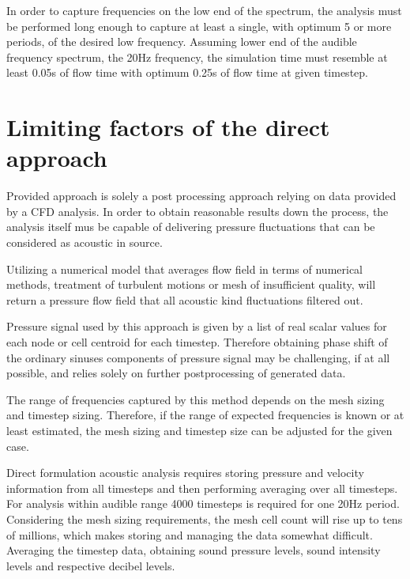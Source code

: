 In order to capture frequencies on the low end of the spectrum, the analysis must be performed long enough to capture at least a single, with optimum 5 or more periods, of the desired low frequency. Assuming lower end of the audible frequency spectrum, the 20Hz frequency, the simulation time must resemble at least 0.05s of flow time with optimum 0.25s of flow time at given timestep.


\section{Limiting factors of the direct approach} \label{limits}
Provided approach is solely a post processing approach relying on data provided by a CFD analysis. In order to obtain reasonable results down the process, the analysis itself mus be capable of delivering pressure fluctuations that can be considered as acoustic in source.

Utilizing a numerical model that averages flow field in terms of numerical methods, treatment of turbulent motions or mesh of insufficient quality, will return a pressure flow field that all acoustic kind fluctuations filtered out. 

Pressure signal used by this approach is given by a list of real scalar values for each node or cell centroid for each timestep. Therefore obtaining phase shift of the ordinary sinuses components of pressure signal may be challenging, if at all possible, and relies solely on further postprocessing of generated data. 

The range of frequencies captured by this method depends on the mesh sizing and timestep sizing. Therefore, if the range of expected frequencies is known or at least estimated, the mesh sizing and timestep size can be adjusted for the given case.
 
Direct formulation acoustic analysis requires storing pressure and velocity information from all timesteps and then performing averaging over all timesteps. For analysis within audible range 4000 timesteps is required for one 20Hz period. Considering the mesh sizing requirements, the mesh cell count will rise up to tens of millions, which makes storing and managing the data somewhat difficult. Averaging the timestep data, obtaining sound pressure levels, sound intensity levels and respective decibel levels. 

